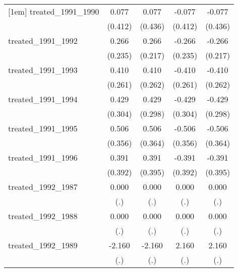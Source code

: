 {\begin{tabular}{l*{4}{c}}
[1em]
treated\_1991\_1990&       0.077         &       0.077         &      -0.077         &      -0.077         \\
            &     (0.412)         &     (0.436)         &     (0.412)         &     (0.436)         \\
[1em]
treated\_1991\_1992&       0.266         &       0.266         &      -0.266         &      -0.266         \\
            &     (0.235)         &     (0.217)         &     (0.235)         &     (0.217)         \\
[1em]
treated\_1991\_1993&       0.410         &       0.410         &      -0.410         &      -0.410         \\
            &     (0.261)         &     (0.262)         &     (0.261)         &     (0.262)         \\
[1em]
treated\_1991\_1994&       0.429         &       0.429         &      -0.429         &      -0.429         \\
            &     (0.304)         &     (0.298)         &     (0.304)         &     (0.298)         \\
[1em]
treated\_1991\_1995&       0.506         &       0.506         &      -0.506         &      -0.506         \\
            &     (0.356)         &     (0.364)         &     (0.356)         &     (0.364)         \\
[1em]
treated\_1991\_1996&       0.391         &       0.391         &      -0.391         &      -0.391         \\
            &     (0.392)         &     (0.395)         &     (0.392)         &     (0.395)         \\
[1em]
treated\_1992\_1987&       0.000         &       0.000         &       0.000         &       0.000         \\
            &         (.)         &         (.)         &         (.)         &         (.)         \\
[1em]
treated\_1992\_1988&       0.000         &       0.000         &       0.000         &       0.000         \\
            &         (.)         &         (.)         &         (.)         &         (.)         \\
[1em]
treated\_1992\_1989&      -2.160         &      -2.160         &       2.160         &       2.160         \\
            &         (.)         &         (.)         &         (.)         &         (.)         \\

\end{tabular}}
